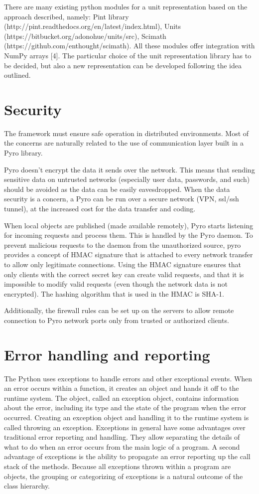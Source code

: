 \documentclass[a4paper,11pt]{article}
\begin{document}
There are many existing python modules for a unit representation based on the approach described, namely:
Pint library (http://pint.readthedocs.org/en/latest/index.html),
Units (https://bitbucket.org/adonohue/units/src),
Scimath (https://github.com/enthought/scimath). 
All these modules offer integration with NumPy arrays [4]. The particular choice of the unit representation library has to be decided, but also a new representation can be developed following the idea outlined.

\section{Security}

The framework must ensure safe operation in distributed environments. Most of the concerns are naturally related to the use of communication layer built in a Pyro library.

Pyro doesn’t encrypt the data it sends over the network. This means that sending sensitive data on untrusted networks (especially user data, passwords, and such) should be avoided as the data can be easily eavesdropped. When the data security is a concern, a Pyro can be run over a secure network (VPN, ssl/ssh tunnel), at the increased cost for the data transfer and coding.

When local objects are published (made available remotely), Pyro starts listening for incoming requests and process them. This is handled by the Pyro daemon. To prevent malicious requests to the daemon from the unauthorized source, pyro provides a concept of HMAC signature that is attached to every network transfer to allow only legitimate connections. Using the HMAC signature ensures that only clients with the correct secret key can create valid requests, and that it is impossible to modify valid requests (even though the network data is not encrypted). The hashing algorithm that is used in the HMAC is SHA-1.

Additionally, the firewall rules can be set up on the servers to allow remote connection to Pyro network ports only from trusted or authorized clients.


\section{Error handling and reporting}

The Python uses exceptions to handle errors and other exceptional events. When an error occurs within a function, it creates an object and hands it off to the runtime system. The object, called an exception object, contains information about the error, including its type and the state of the program when the error occurred. Creating an exception object and handling it to the runtime system is called throwing an exception. Exceptions in general have some advantages over traditional error reporting and handling. They allow separating the details of what to do when an error occurs from the main logic of a program. A second advantage of exceptions is the ability to propagate an error reporting up the call stack of the methods. Because all exceptions thrown within a program are objects, the grouping or categorizing of exceptions is a natural outcome of the class hierarchy.
\end{document}
